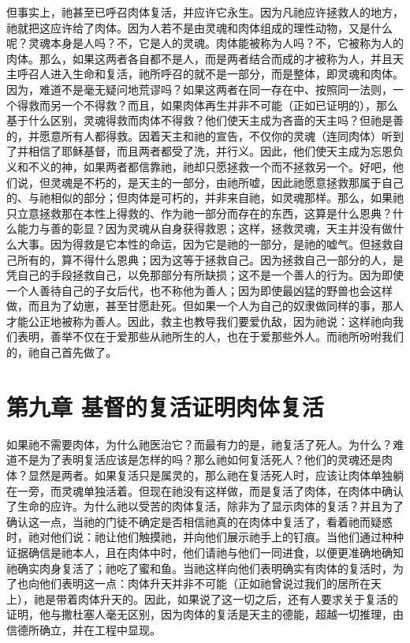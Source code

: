 但事实上，祂甚至已呼召肉体复活，并应许它永生。因为凡祂应许拯救人的地方，祂就把这应许给了肉体。因为人若不是由灵魂和肉体组成的理性动物，又是什么呢？灵魂本身是人吗？不，它是人的灵魂。肉体能被称为人吗？不，它被称为人的肉体。那么，如果这两者各自都不是人，而是两者结合而成的才被称为人，并且天主呼召人进入生命和复活，祂所呼召的就不是一部分，而是整体，即灵魂和肉体。因为，难道不是毫无疑问地荒谬吗？如果这两者在同一存在中、按照同一法则，一个得救而另一个不得救？而且，如果肉体再生并非不可能（正如已证明的），那么基于什么区别，灵魂得救而肉体不得救？他们使天主成为吝啬的天主吗？但祂是善的，并愿意所有人都得救。因着天主和祂的宣告，不仅你的灵魂（连同肉体）听到了并相信了耶稣基督，而且两者都受了洗，并行义。因此，他们使天主成为忘恩负义和不义的神，如果两者都信靠祂，祂却只愿拯救一个而不拯救另一个。好吧，他们说，但灵魂是不朽的，是天主的一部分，由祂所嘘，因此祂愿意拯救那属于自己的、与祂相似的部分；但肉体是可朽的，并非来自祂，如灵魂那样。那么，如果祂只立意拯救那在本性上得救的、作为祂一部分而存在的东西，这算是什么恩典？什么能力与善的彰显？因为灵魂从自身获得救恩；这样，拯救灵魂，天主并没有做什么大事。因为得救是它本性的命运，因为它是祂的一部分，是祂的嘘气。但拯救自己所有的，算不得什么恩典；因为这等于拯救自己。因为拯救自己一部分的人，是凭自己的手段拯救自己，以免那部分有所缺损；这不是一个善人的行为。因为即使一个人善待自己的子女后代，也不称他为善人；因为即使最凶猛的野兽也会这样做，而且为了幼崽，甚至甘愿赴死。但如果一个人为自己的奴隶做同样的事，那人才能公正地被称为善人。因此，救主也教导我们要爱仇敌，因为祂说：这样祂向我们表明，善举不仅在于爱那些从祂所生的人，也在于爱那些外人。而祂所吩咐我们的，祂自己首先做了。\par


\section{第九章  基督的复活证明肉体复活}

如果祂不需要肉体，为什么祂医治它？而最有力的是，祂复活了死人。为什么？难道不是为了表明复活应该是怎样的吗？那么祂如何复活死人？他们的灵魂还是肉体？显然是两者。如果复活只是属灵的，那么祂在复活死人时，应该让肉体单独躺在一旁，而灵魂单独活着。但现在祂没有这样做，而是复活了肉体，在肉体中确认了生命的应许。为什么祂以受苦的肉体复活，除非为了显示肉体的复活？并且为了确认这一点，当祂的门徒不确定是否相信祂真的在肉体中复活了，看着祂而疑惑时，祂对他们说：祂让他们触摸祂，并向他们展示祂手上的钉痕。当他们通过种种证据确信是祂本人，且在肉体中时，他们请祂与他们一同进食，以便更准确地确知祂确实肉身复活了；祂吃了蜜和鱼。当祂这样向他们表明确实有肉体的复活时，为了也向他们表明这一点：肉体升天并非不可能（正如祂曾说过我们的居所在天上），祂是带着肉体升天的。因此，如果说了这一切之后，还有人要求关于复活的证明，他与撒杜塞人毫无区别，因为肉体的复活是天主的德能，超越一切推理，由信德所确立，并在工程中显现。\par

